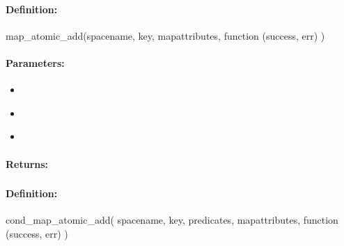 \paragraph{Definition:}
\begin{javascriptcode}
map_atomic_add(spacename, key, mapattributes, function (success, err) {})
\end{javascriptcode}
\paragraph{Parameters:}
\begin{itemize}[noitemsep]
\item {}\\

\item {}\\

\item {}\\

\end{itemize}

\paragraph{Returns:}


\pagebreak
\subsubsection{}
\label{api:nodejs:cond_map_atomic_add}


\paragraph{Definition:}
\begin{javascriptcode}
cond_map_atomic_add(
        spacename, key, predicates, mapattributes, function (success, err) {})
\end{javascriptcode}
